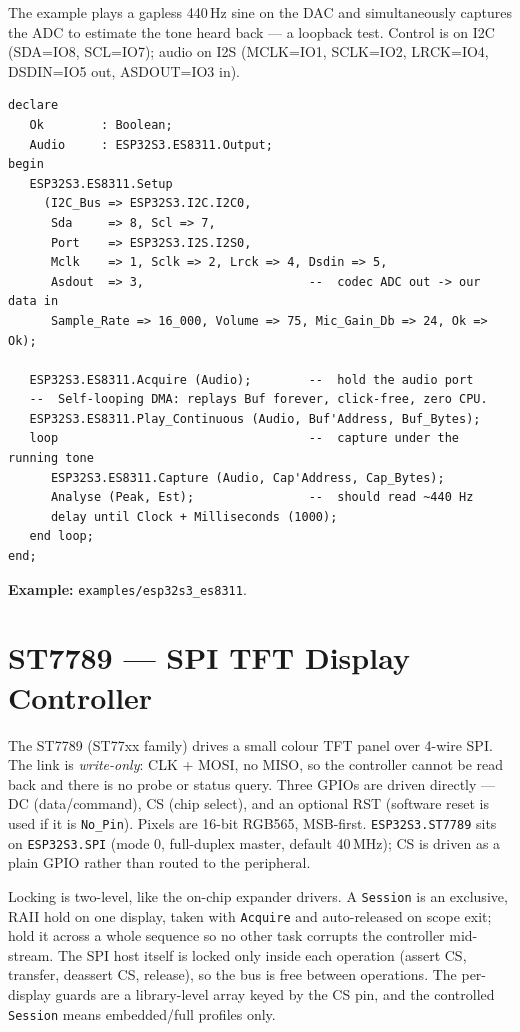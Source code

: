 The example plays a gapless 440\,Hz sine on the DAC and simultaneously captures the
ADC to estimate the tone heard back --- a loopback test. Control is on I2C (SDA=IO8,
SCL=IO7); audio on I2S (MCLK=IO1, SCLK=IO2, LRCK=IO4, DSDIN=IO5 out, ASDOUT=IO3 in).

\begin{lstlisting}
declare
   Ok        : Boolean;
   Audio     : ESP32S3.ES8311.Output;
begin
   ESP32S3.ES8311.Setup
     (I2C_Bus => ESP32S3.I2C.I2C0,
      Sda     => 8, Scl => 7,
      Port    => ESP32S3.I2S.I2S0,
      Mclk    => 1, Sclk => 2, Lrck => 4, Dsdin => 5,
      Asdout  => 3,                       --  codec ADC out -> our data in
      Sample_Rate => 16_000, Volume => 75, Mic_Gain_Db => 24, Ok => Ok);

   ESP32S3.ES8311.Acquire (Audio);        --  hold the audio port
   --  Self-looping DMA: replays Buf forever, click-free, zero CPU.
   ESP32S3.ES8311.Play_Continuous (Audio, Buf'Address, Buf_Bytes);
   loop                                   --  capture under the running tone
      ESP32S3.ES8311.Capture (Audio, Cap'Address, Cap_Bytes);
      Analyse (Peak, Est);                --  should read ~440 Hz
      delay until Clock + Milliseconds (1000);
   end loop;
end;
\end{lstlisting}

\noindent\textbf{Example:} \texttt{examples/esp32s3\_es8311}.

\section{ST7789 --- SPI TFT Display Controller}
\label{app:ext:st7789}

The ST7789 (ST77xx family) drives a small colour TFT panel over 4-wire SPI. The
link is \emph{write-only}: CLK + MOSI, no MISO, so the controller cannot be read
back and there is no probe or status query. Three GPIOs are driven directly --- DC
(data/command), CS (chip select), and an optional RST (software reset is used if it
is \texttt{No\_Pin}). Pixels are 16-bit RGB565, MSB-first. \texttt{ESP32S3.ST7789}
sits on \texttt{ESP32S3.SPI} (mode 0, full-duplex master, default 40\,MHz); CS is
driven as a plain GPIO rather than routed to the peripheral.

Locking is two-level, like the on-chip expander drivers. A \texttt{Session} is an
exclusive, RAII hold on one display, taken with \texttt{Acquire} and auto-released
on scope exit; hold it across a whole sequence so no other task corrupts the
controller mid-stream. The SPI host itself is locked only inside each operation
(assert CS, transfer, deassert CS, release), so the bus is free between operations.
The per-display guards are a library-level array keyed by the CS pin, and the
controlled \texttt{Session} means embedded/full profiles only.

